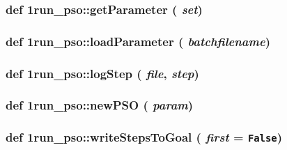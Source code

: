\hypertarget{namespace1run__pso_a2417e9179c3deb2afc2ce7abadd92b4}{
\subsubsection{\setlength{\rightskip}{0pt plus 5cm}def 1run\_\-pso::getParameter ( {\em set})}}
\label{namespace1run__pso_a2417e9179c3deb2afc2ce7abadd92b4}


\hypertarget{namespace1run__pso_cdea20440c628cecc2b9d5f96294b17d}{
\subsubsection{\setlength{\rightskip}{0pt plus 5cm}def 1run\_\-pso::loadParameter ( {\em batchfilename})}}
\label{namespace1run__pso_cdea20440c628cecc2b9d5f96294b17d}


\hypertarget{namespace1run__pso_3bc1038823675978297b8b7f2522f9be}{
\subsubsection{\setlength{\rightskip}{0pt plus 5cm}def 1run\_\-pso::logStep ( {\em file}, \/   {\em step})}}
\label{namespace1run__pso_3bc1038823675978297b8b7f2522f9be}


\hypertarget{namespace1run__pso_69791748325e4a2d8da2348215efbc27}{
\subsubsection{\setlength{\rightskip}{0pt plus 5cm}def 1run\_\-pso::newPSO ( {\em param})}}
\label{namespace1run__pso_69791748325e4a2d8da2348215efbc27}


\hypertarget{namespace1run__pso_12a59cd77498da5a806d37f3f06c64a5}{
\subsubsection{\setlength{\rightskip}{0pt plus 5cm}def 1run\_\-pso::writeStepsToGoal ( {\em first} = {\tt False})}}
\label{namespace1run__pso_12a59cd77498da5a806d37f3f06c64a5}




